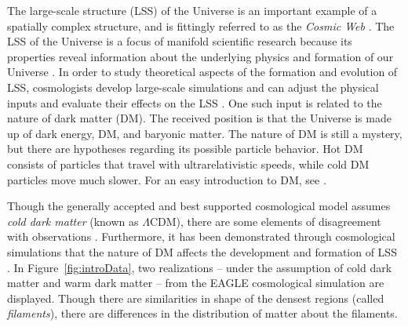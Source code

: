 \documentclass[12pt]{article}
\newcommand{\figref}[1]{Figure~\ref{#1}}
\begin{document}
The large-scale structure (LSS) of the Universe is an important example of a spatially complex structure, and is fittingly referred to as the \emph{Cosmic Web} \citep{bond1996filaments,springel2006large}. The LSS of the Universe is a focus of manifold scientific research because its properties reveal information about the underlying physics and formation of our Universe \citep{davis1985evolution}. In order to study theoretical aspects of the formation and evolution of LSS, cosmologists develop large-scale simulations and can adjust the physical inputs and evaluate their effects on the LSS \citep{cooray2002halo,centrella1983three,doroshkevich1980two,schaye2015eagle}. One such input is related to the nature of dark matter (DM). The received position is that the Universe is made up of dark energy, DM, and baryonic matter. The nature of DM is still a mystery, but there are hypotheses regarding its possible particle behavior. Hot DM consists of particles that travel with ultrarelativistic speeds, while cold DM particles move much slower. For an easy introduction to DM, see \cite[p. 61-63]{HilbeEtAl2014}.  

Though the generally accepted and best supported cosmological model assumes \emph{cold dark matter} (known as $\Lambda$CDM), there are some elements of disagreement with observations \citep{SchneiderEtAl2012}. Furthermore, it has been demonstrated through cosmological simulations that the nature of DM affects the development and formation of LSS \citep{SchneiderEtAl2012}.  In \figref{fig:introData}, two realizations -- under the assumption of cold dark matter and warm dark matter -- from the EAGLE cosmological simulation \citep{schaye2015eagle} are displayed. Though there are similarities in shape of the densest regions (called \emph{filaments}), there are differences in the distribution of matter about the filaments.  
\end{document}
